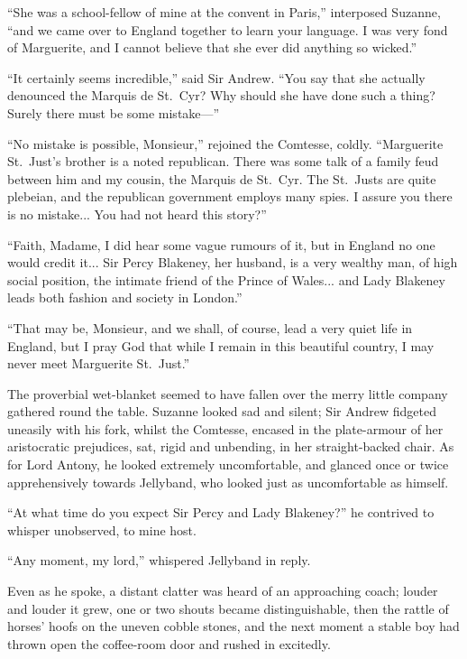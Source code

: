 \documentclass[paper=a5,BCOR=7mm,twoside,DIV=calc,12pt,usegeometry,chapterprefix,endperiod,headings=big]{scrbook}
\begin{document}
\enquote{She was a school-fellow of mine at the convent in Paris,} interposed Suzanne, \enquote{and we came over to England together to learn your language. I was very fond of Marguerite, and I cannot believe that she ever did anything so wicked.}

\enquote{It certainly seems incredible,} said Sir Andrew. \enquote{You say that she actually denounced the Marquis de St.~Cyr? Why should she have done such a thing? Surely there must be some mistake---}

\enquote{No mistake is possible, Monsieur,} rejoined the Comtesse, coldly. \enquote{Marguerite St.~Just's brother is a noted republican. There was some talk of a family feud between him and my cousin, the Marquis de St.~Cyr. The St.~Justs are quite plebeian, and the republican government employs many spies. I assure you there is no mistake... You had not heard this story?}

\enquote{Faith, Madame, I did hear some vague rumours of it, but in England no one would credit it... Sir Percy Blakeney, her husband, is a very wealthy man, of high social position, the intimate friend of the Prince of Wales... and Lady Blakeney leads both fashion and society in London.}

\enquote{That may be, Monsieur, and we shall, of course, lead a very quiet life in England, but I pray God that while I remain in this beautiful country, I may never meet Marguerite St.~Just.}

The proverbial wet-blanket seemed to have fallen over the merry little company gathered round the table. Suzanne looked sad and silent; Sir Andrew fidgeted uneasily with his fork, whilst the Comtesse, encased in the plate-armour of her aristocratic prejudices, sat, rigid and unbending, in her straight-backed chair. As for Lord Antony, he looked extremely uncomfortable, and glanced once or twice apprehensively towards Jellyband, who looked just as uncomfortable as himself.

\enquote{At what time do you expect Sir Percy and Lady Blakeney?} he contrived to whisper unobserved, to mine host.

\enquote{Any moment, my lord,} whispered Jellyband in reply.

Even as he spoke, a distant clatter was heard of an approaching coach; louder and louder it grew, one or two shouts became distinguishable, then the rattle of horses’ hoofs on the uneven cobble stones, and the next moment a stable boy had thrown open the coffee-room door and rushed in excitedly.
\end{document}
